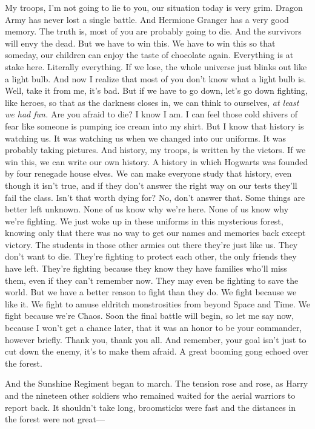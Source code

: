 My troops, I'm not going to lie to you, our situation today is very grim.
Dragon Army has never lost a single battle. And Hermione Granger{\el} has a
very good memory. The truth is, most of you are probably going to die. And the
survivors will envy the dead. But we have to win this. We have to win this so
that someday, our children can enjoy the taste of chocolate again. Everything
is at stake here. Literally everything. If we lose, the whole universe just
blinks out like a light bulb. And now I realize that most of you don't know
what a light bulb is. Well, take it from me, it's bad. But if we have to go
down, let's go down fighting, like heroes, so that as the darkness closes in,
we can think to ourselves, \emph{at least we had fun.} Are you afraid to die? I
know I am. I can feel those cold shivers of fear like someone is pumping ice
cream into my shirt. But I know{\el} that history is watching us. It was
watching us when we changed into our uniforms. It was probably taking pictures.
And history, my troops, is written by the victors. If we win this, we can write
our own history. A history in which Hogwarts was founded by four renegade house
elves. We can make everyone study that history, even though it isn't true, and
if they don't answer the right way on our tests{\el} they'll fail the class.
Isn't that worth dying for? No, don't answer that. Some things are better left
unknown. None of us know why we're here. None of us know why we're fighting. We
just woke up in these uniforms in this mysterious forest, knowing only that
there was no way to get our names and memories back except victory. The
students in those other armies out there{\el} they're just like us. They
don't want to die. They're fighting to protect each other, the only friends
they have left. They're fighting because they know they have families who'll
miss them, even if they can't remember now. They may even be fighting to save
the world. But we have a better reason to fight than they do. We fight because
we like it. We fight to amuse eldritch monstrosities from beyond Space and
Time. We fight because we're Chaos. Soon the final battle will begin, so let me
say now, because I won't get a chance later, that it was an honor to be your
commander, however briefly. Thank you, thank you all. And remember, your goal
isn't just to cut down the enemy, it's to make them afraid.
\sbreak
A great booming gong echoed over the forest.

And the Sunshine Regiment began to march.
\sbreak
The tension rose and rose, as Harry and the nineteen other soldiers who
remained waited for the aerial warriors to report back. It shouldn't take long,
broomsticks were fast and the distances in the forest were not great---

